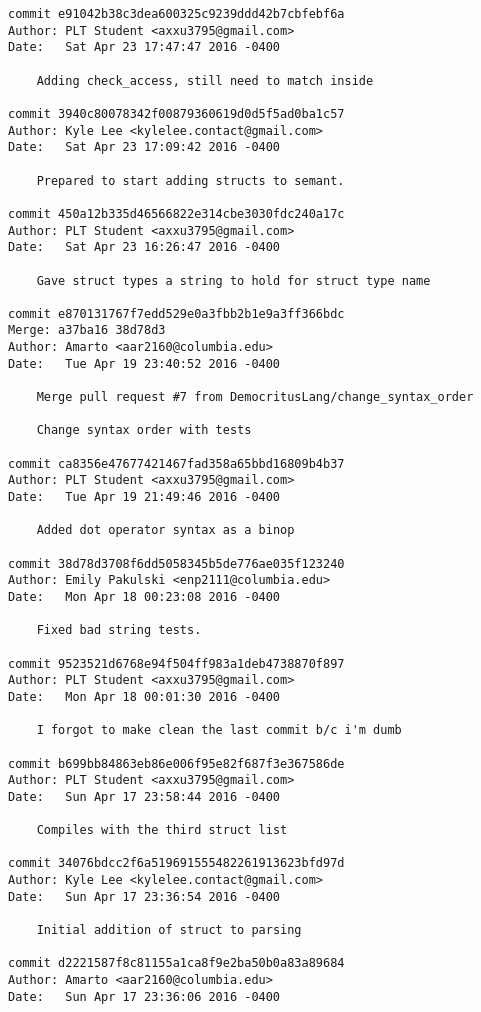 \begin{lstlisting}[backgroundcolor=\color{white}]
commit e91042b38c3dea600325c9239ddd42b7cbfebf6a
Author: PLT Student <axxu3795@gmail.com>
Date:   Sat Apr 23 17:47:47 2016 -0400

    Adding check_access, still need to match inside

commit 3940c80078342f00879360619d0d5f5ad0ba1c57
Author: Kyle Lee <kylelee.contact@gmail.com>
Date:   Sat Apr 23 17:09:42 2016 -0400

    Prepared to start adding structs to semant.

commit 450a12b335d46566822e314cbe3030fdc240a17c
Author: PLT Student <axxu3795@gmail.com>
Date:   Sat Apr 23 16:26:47 2016 -0400

    Gave struct types a string to hold for struct type name

commit e870131767f7edd529e0a3fbb2b1e9a3ff366bdc
Merge: a37ba16 38d78d3
Author: Amarto <aar2160@columbia.edu>
Date:   Tue Apr 19 23:40:52 2016 -0400

    Merge pull request #7 from DemocritusLang/change_syntax_order
    
    Change syntax order with tests

commit ca8356e47677421467fad358a65bbd16809b4b37
Author: PLT Student <axxu3795@gmail.com>
Date:   Tue Apr 19 21:49:46 2016 -0400

    Added dot operator syntax as a binop

commit 38d78d3708f6dd5058345b5de776ae035f123240
Author: Emily Pakulski <enp2111@columbia.edu>
Date:   Mon Apr 18 00:23:08 2016 -0400

    Fixed bad string tests.

commit 9523521d6768e94f504ff983a1deb4738870f897
Author: PLT Student <axxu3795@gmail.com>
Date:   Mon Apr 18 00:01:30 2016 -0400

    I forgot to make clean the last commit b/c i'm dumb

commit b699bb84863eb86e006f95e82f687f3e367586de
Author: PLT Student <axxu3795@gmail.com>
Date:   Sun Apr 17 23:58:44 2016 -0400

    Compiles with the third struct list

commit 34076bdcc2f6a519691555482261913623bfd97d
Author: Kyle Lee <kylelee.contact@gmail.com>
Date:   Sun Apr 17 23:36:54 2016 -0400

    Initial addition of struct to parsing

commit d2221587f8c81155a1ca8f9e2ba50b0a83a89684
Author: Amarto <aar2160@columbia.edu>
Date:   Sun Apr 17 23:36:06 2016 -0400


\end{lstlisting}
